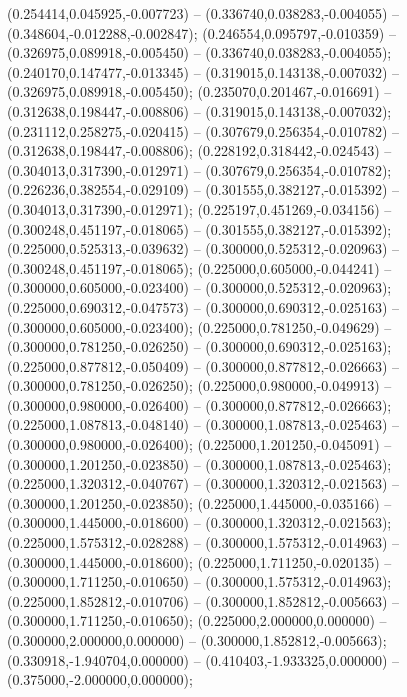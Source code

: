  (0.254414,0.045925,-0.007723) -- (0.336740,0.038283,-0.004055) -- (0.348604,-0.012288,-0.002847);
 (0.246554,0.095797,-0.010359) -- (0.326975,0.089918,-0.005450) -- (0.336740,0.038283,-0.004055);
 (0.240170,0.147477,-0.013345) -- (0.319015,0.143138,-0.007032) -- (0.326975,0.089918,-0.005450);
 (0.235070,0.201467,-0.016691) -- (0.312638,0.198447,-0.008806) -- (0.319015,0.143138,-0.007032);
 (0.231112,0.258275,-0.020415) -- (0.307679,0.256354,-0.010782) -- (0.312638,0.198447,-0.008806);
 (0.228192,0.318442,-0.024543) -- (0.304013,0.317390,-0.012971) -- (0.307679,0.256354,-0.010782);
 (0.226236,0.382554,-0.029109) -- (0.301555,0.382127,-0.015392) -- (0.304013,0.317390,-0.012971);
 (0.225197,0.451269,-0.034156) -- (0.300248,0.451197,-0.018065) -- (0.301555,0.382127,-0.015392);
 (0.225000,0.525313,-0.039632) -- (0.300000,0.525312,-0.020963) -- (0.300248,0.451197,-0.018065);
 (0.225000,0.605000,-0.044241) -- (0.300000,0.605000,-0.023400) -- (0.300000,0.525312,-0.020963);
 (0.225000,0.690312,-0.047573) -- (0.300000,0.690312,-0.025163) -- (0.300000,0.605000,-0.023400);
 (0.225000,0.781250,-0.049629) -- (0.300000,0.781250,-0.026250) -- (0.300000,0.690312,-0.025163);
 (0.225000,0.877812,-0.050409) -- (0.300000,0.877812,-0.026663) -- (0.300000,0.781250,-0.026250);
 (0.225000,0.980000,-0.049913) -- (0.300000,0.980000,-0.026400) -- (0.300000,0.877812,-0.026663);
 (0.225000,1.087813,-0.048140) -- (0.300000,1.087813,-0.025463) -- (0.300000,0.980000,-0.026400);
 (0.225000,1.201250,-0.045091) -- (0.300000,1.201250,-0.023850) -- (0.300000,1.087813,-0.025463);
 (0.225000,1.320312,-0.040767) -- (0.300000,1.320312,-0.021563) -- (0.300000,1.201250,-0.023850);
 (0.225000,1.445000,-0.035166) -- (0.300000,1.445000,-0.018600) -- (0.300000,1.320312,-0.021563);
 (0.225000,1.575312,-0.028288) -- (0.300000,1.575312,-0.014963) -- (0.300000,1.445000,-0.018600);
 (0.225000,1.711250,-0.020135) -- (0.300000,1.711250,-0.010650) -- (0.300000,1.575312,-0.014963);
 (0.225000,1.852812,-0.010706) -- (0.300000,1.852812,-0.005663) -- (0.300000,1.711250,-0.010650);
 (0.225000,2.000000,0.000000) -- (0.300000,2.000000,0.000000) -- (0.300000,1.852812,-0.005663);
 (0.330918,-1.940704,0.000000) -- (0.410403,-1.933325,0.000000) -- (0.375000,-2.000000,0.000000);
